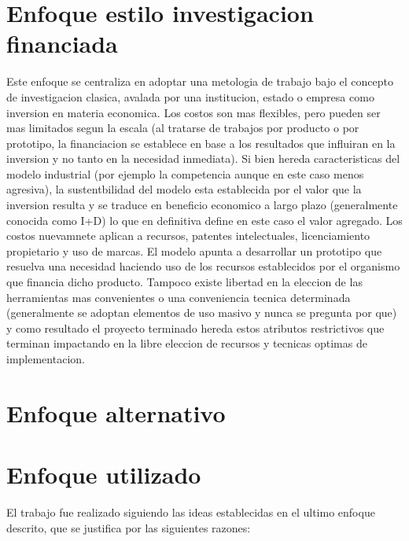 \section {Enfoque estilo investigacion financiada}
Este enfoque se centraliza en adoptar una metologia de trabajo bajo el concepto
de investigacion clasica, avalada por una institucion, estado  o empresa como
inversion en materia economica. Los costos son mas flexibles, pero pueden ser
mas limitados segun la escala (al tratarse de trabajos por producto o por
prototipo, la financiacion se establece en base a los resultados que influiran
en la inversion y no tanto en la necesidad inmediata).
Si bien hereda caracteristicas del modelo industrial (por ejemplo la
competencia aunque en este caso menos agresiva), la sustentbilidad del modelo
esta establecida por el valor que la inversion resulta y se traduce en
beneficio economico a largo plazo (generalmente conocida como I+D)
lo que en definitiva define en este caso el valor agregado. Los costos
nuevamnete aplican a recursos, patentes intelectuales, licenciamiento
propietario y uso de marcas.
El modelo apunta a desarrollar un prototipo que resuelva una necesidad 
haciendo uso de los recursos establecidos por el organismo que financia dicho
producto. Tampoco existe libertad en la eleccion de las herramientas mas
convenientes o una conveniencia tecnica determinada (generalmente se adoptan
elementos de uso masivo y nunca se pregunta por que) y como resultado 
el proyecto terminado hereda estos atributos restrictivos que terminan
impactando en la libre eleccion de recursos y tecnicas optimas de
implementacion. 
\section {Enfoque alternativo}
%
% 

\section{Enfoque utilizado} 
El trabajo fue realizado siguiendo las ideas establecidas en el ultimo enfoque
descrito, que se justifica por las siguientes razones:
